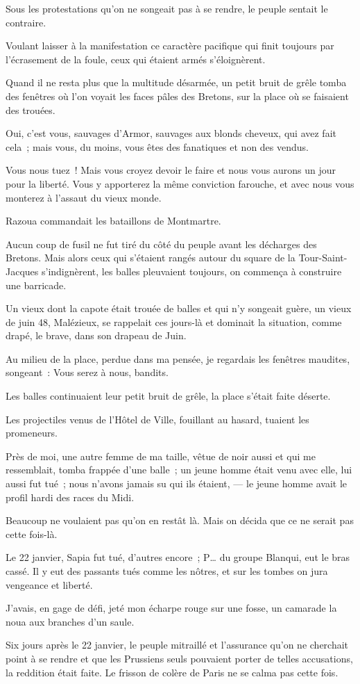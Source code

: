 \documentclass[french,twoside]{book} %
\newcommand\chapterclose{} %
\begin{document}
Sous les protestations qu’on ne songeait pas à se rendre, le peuple sentait le contraire.\par
Voulant laisser à la manifestation ce caractère pacifique qui finit toujours par l’écrasement de la foule, ceux qui étaient armés s’éloignèrent.\par
Quand il ne resta plus que la multitude désarmée, un petit bruit de grêle tomba des fenêtres  où l’on voyait les faces pâles des Bretons, sur la place où se faisaient des trouées.\par
Oui, c’est vous, sauvages d’Armor, sauvages aux blonds cheveux, qui avez fait cela ; mais vous, du moins, vous êtes des fanatiques et non des vendus.\par
Vous nous tuez ! Mais vous croyez devoir le faire et nous vous aurons un jour pour la liberté. Vous y apporterez la même conviction farouche, et avec nous vous monterez à l’assaut du vieux monde.\par
Razoua commandait les bataillons de Montmartre.\par
Aucun coup de fusil ne fut tiré du côté du peuple avant les décharges des Bretons. Mais alors ceux qui s’étaient rangés autour du square de la Tour-Saint-Jacques s’indignèrent, les balles pleuvaient toujours, on commença à construire une barricade.\par
Un vieux dont la capote était trouée de balles et qui n’y songeait guère, un vieux de juin 48, Malézieux, se rappelait ces jours-là et dominait la situation, comme drapé, le brave, dans son drapeau de Juin.\par
Au milieu de la place, perdue dans ma pensée, je regardais les fenêtres maudites, songeant : Vous serez à nous, bandits.\par
 Les balles continuaient leur petit bruit de grêle, la place s’était faite déserte.\par
Les projectiles venus de l’Hôtel de Ville, fouillant au hasard, tuaient les promeneurs.\par
Près de moi, une autre femme de ma taille, vêtue de noir aussi et qui me ressemblait, tomba frappée d’une balle ; un jeune homme était venu avec elle, lui aussi fut tué ; nous n’avons jamais su qui ils étaient, — le jeune homme avait le profil hardi des races du Midi.\par
Beaucoup ne voulaient pas qu’on en restât là. Mais on décida que ce ne serait pas cette fois-là.\par
Le 22 janvier, Sapia fut tué, d’autres encore ; P… du groupe Blanqui, eut le bras cassé. Il y eut des passants tués comme les nôtres, et sur les tombes on jura vengeance et liberté.\par
J’avais, en gage de défi, jeté mon écharpe rouge sur une fosse, un camarade la noua aux branches d’un saule.\par
Six jours après le 22 janvier, le peuple mitraillé et l’assurance qu’on ne cherchait point à se rendre et que les Prussiens seuls pouvaient porter de telles accusations, la reddition était faite. Le frisson de colère de Paris ne se calma pas cette fois.
\chapterclose
\end{document}
